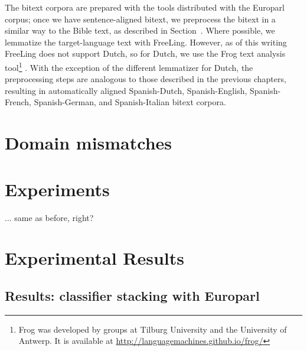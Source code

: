 The bitext corpora are prepared with the tools distributed with the Europarl
corpus; once we have sentence-aligned bitext, we preprocess the bitext in a
similar way to the Bible text, as described in
Section~\label{sec:datasetsandpreprocessing}. Where possible, we lemmatize the
target-language text with FreeLing. However, as of this writing FreeLing does
not support Dutch, so for Dutch, we use the Frog text analysis
tool\footnote{Frog was developed by groups at Tilburg
University and the University of Antwerp. It is available at
\url{http://languagemachines.github.io/frog/}} \cite{tadpole2007}. With the
exception of the different lemmatizer for Dutch, the preprocessing steps are
analogous to those described in the previous chapters, resulting in
automatically aligned Spanish-Dutch, Spanish-English, Spanish-French,
Spanish-German, and Spanish-Italian bitext corpora.

\section{Domain mismatches}

\section{Experiments}
\label{sec:multilingual-experiments}
... same as before, right?

\section{Experimental Results}
\label{sec:multilingual-results}

\subsection{Results: classifier stacking with Europarl}

